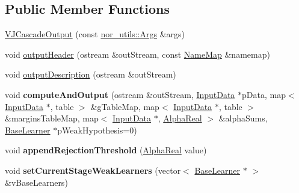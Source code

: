 \subsection*{Public Member Functions}
\begin{DoxyCompactItemize}
\item 
\hyperlink{classMultiBoost_1_1VJCascadeOutput_a53f4e4e3b53bca6e12e4554058cd0fbf}{V\-J\-Cascade\-Output} (const \hyperlink{classnor__utils_1_1Args}{nor\-\_\-utils\-::\-Args} \&args)
\item 
void \hyperlink{classMultiBoost_1_1VJCascadeOutput_a294c3882cdca5e62f52358d40c7ed156}{output\-Header} (ostream \&out\-Stream, const \hyperlink{classMultiBoost_1_1NameMap}{Name\-Map} \&namemap)
\item 
void \hyperlink{classMultiBoost_1_1VJCascadeOutput_afa0b1cf483fd4d20ee93e7688fce0b94}{output\-Description} (ostream \&out\-Stream)
\item 
\hypertarget{classMultiBoost_1_1VJCascadeOutput_a13454314073d55e96f2ade2504db0cea}{void {\bfseries compute\-And\-Output} (ostream \&out\-Stream, \hyperlink{classMultiBoost_1_1InputData}{Input\-Data} $\ast$p\-Data, map$<$ \hyperlink{classMultiBoost_1_1InputData}{Input\-Data} $\ast$, table $>$ \&g\-Table\-Map, map$<$ \hyperlink{classMultiBoost_1_1InputData}{Input\-Data} $\ast$, table $>$ \&margins\-Table\-Map, map$<$ \hyperlink{classMultiBoost_1_1InputData}{Input\-Data} $\ast$, \hyperlink{Defaults_8h_a80184c4fd10ab70a1a17c5f97dcd1563}{Alpha\-Real} $>$ \&alpha\-Sums, \hyperlink{classMultiBoost_1_1BaseLearner}{Base\-Learner} $\ast$p\-Weak\-Hypothesis=0)}\label{classMultiBoost_1_1VJCascadeOutput_a13454314073d55e96f2ade2504db0cea}

\item 
\hypertarget{classMultiBoost_1_1VJCascadeOutput_a4b8caf1ad9624a8bc55c4d1e5fecb425}{void {\bfseries append\-Rejection\-Threshold} (\hyperlink{Defaults_8h_a80184c4fd10ab70a1a17c5f97dcd1563}{Alpha\-Real} value)}\label{classMultiBoost_1_1VJCascadeOutput_a4b8caf1ad9624a8bc55c4d1e5fecb425}

\item 
\hypertarget{classMultiBoost_1_1VJCascadeOutput_a4daf967eeed6eec2f0b2fe55815ea444}{void {\bfseries set\-Current\-Stage\-Weak\-Learners} (vector$<$ \hyperlink{classMultiBoost_1_1BaseLearner}{Base\-Learner} $\ast$ $>$ \&v\-Base\-Learners)}\label{classMultiBoost_1_1VJCascadeOutput_a4daf967eeed6eec2f0b2fe55815ea444}

\end{DoxyCompactItemize}
